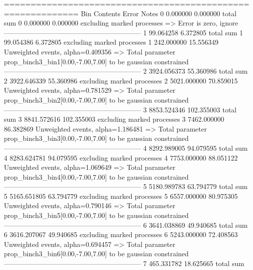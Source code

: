 ============================================================
Bin        Contents        Error           Notes                         
0          0.000000        0.000000        total sum                     
0          0.000000        0.000000        excluding marked processes    
  => Error is zero, ignore      
------------------------------------------------------------
1          99.064258       6.372805        total sum                     
1          99.054386       6.372805        excluding marked processes    
1          242.000000      15.556349       Unweighted events, alpha=0.409356
  => Total parameter prop_binch3_bin1[0.00,-7.00,7.00] to be gaussian constrained
------------------------------------------------------------
2          3924.056373     55.360986       total sum                     
2          3922.646339     55.360986       excluding marked processes    
2          5021.000000     70.859015       Unweighted events, alpha=0.781529
  => Total parameter prop_binch3_bin2[0.00,-7.00,7.00] to be gaussian constrained
------------------------------------------------------------
3          8853.524346     102.355003      total sum                     
3          8841.572616     102.355003      excluding marked processes    
3          7462.000000     86.382869       Unweighted events, alpha=1.186481
  => Total parameter prop_binch3_bin3[0.00,-7.00,7.00] to be gaussian constrained
------------------------------------------------------------
4          8292.989005     94.079595       total sum                     
4          8283.624781     94.079595       excluding marked processes    
4          7753.000000     88.051122       Unweighted events, alpha=1.069649
  => Total parameter prop_binch3_bin4[0.00,-7.00,7.00] to be gaussian constrained
------------------------------------------------------------
5          5180.989783     63.794779       total sum                     
5          5165.651805     63.794779       excluding marked processes    
5          6557.000000     80.975305       Unweighted events, alpha=0.790146
  => Total parameter prop_binch3_bin5[0.00,-7.00,7.00] to be gaussian constrained
------------------------------------------------------------
6          3641.038869     49.940685       total sum                     
6          3616.207067     49.940685       excluding marked processes    
6          5243.000000     72.408563       Unweighted events, alpha=0.694457
  => Total parameter prop_binch3_bin6[0.00,-7.00,7.00] to be gaussian constrained
------------------------------------------------------------
7          465.331782      18.625665       total sum                     
